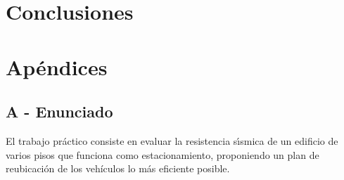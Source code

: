 \documentclass[a4paper]{article}
\begin{document}
\newpage

\section{Conclusiones}

\newpage

\section{Apéndices}
\subsection{A - Enunciado}

El trabajo pr\'actico consiste en evaluar la resistencia s\'\i smica de un
edificio de varios pisos que funciona como estacionamiento, proponiendo un plan de
reubicaci\'on de los veh\'iculos lo m\'as eficiente posible.\\
\end{document}

